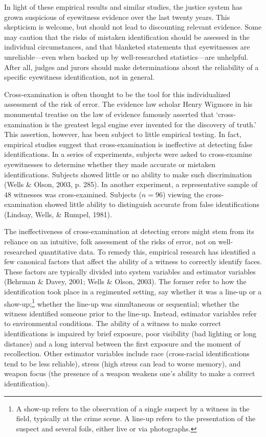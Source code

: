 \documentclass[
  10pt,
  dvipsnames,enabledeprecatedfontcommands]{scrartcl}
\begin{document}
In light of these empirical results and similar studies, the justice
system has grown suspicious of eyewitness evidence over the last twenty
years. This skepticism is welcome, but should not lead to discounting
relevant evidence. Some may caution that the risks of mistaken
identification should be assessed in the individual circumstances, and
that blanketed statements that eyewitnesses are unreliable---even when
backed up by well-researched statistics---are unhelpful. After all,
judges and jurors should make determinations about the reliability of a
specific eyewitness identification, not in general.

Cross-examination is often thought to be the tool for this
individualized assessment of the risk of error. The evidence law scholar
Henry Wigmore in his monumental treatise on the law of evidence famously
asserted that `cross-examination is the greatest legal engine ever
invented for the discovery of truth.' This assertion, however, has been
subject to little empirical testing. In fact, empirical studies suggest
that cross-examination is ineffective at detecting false
identifications. In a series of experiments, subjects were asked to
cross-examine eyewitnesses to determine whether they made accurate or
mistaken identifications. Subjects showed little or no ability to make
such discrimination (Wells \& Olson, 2003, p. 285). In another
experiment, a representative sample of \(48\) witnesses was
cross-examined. Subjects (\(n = 96\)) viewing the cross-examination
showed little ability to distinguish accurate from false identifications
(Lindsay, Wells, \& Rumpel, 1981).

The ineffectiveness of cross-examination at detecting errors might stem
from its reliance on an intuitive, folk assessment of the risks of
error, not on well-researched quantitative data. To remedy this,
empirical research has identified a few canonical factors that affect
the ability of a witness to correctly identify faces. These factors are
typically divided into system variables and estimator variables (Behrman
\& Davey, 2001; Wells \& Olson, 2003). The former refer to how the
identification took place in a regimented setting, say whether it was a
line-up or a
show-up;\footnote{A show-up refers to the observation of a single suspect by a witness in the field, typically at the crime scene. A line-up refers to the presentation of the suspect and several foils, either live or via photographs.}
whether the line-up was simultaneous or sequential; whether the witness
identified someone prior to the line-up. Instead, estimator variables
refer to environmental conditions. The ability of a witness to make
correct identifications is impaired by brief exposure, poor visibility
(bad lighting or long distance) and a long interval between the first
exposure and the moment of recollection. Other estimator variables
include race (cross-racial identifications tend to be less reliable),
stress (high stress can lead to worse memory), and weapon focus (the
presence of a weapon weakens one's ability to make a correct
identification).
\end{document}
